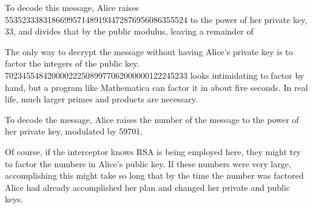 \documentclass[12pt]{article}
\begin{document}
To decode this message, Alice raises 5535233383186699571489193472876956086355524 to the power of her private key, 33, and divides that by the public modulus, leaving a remainder of

The only way to decrypt the message without having Alice's private key is to factor the integers of the public key. 7023455484200002225089977062000000122245233 looks intimidating to factor by hand, but a program like Mathematica can factor it in about five seconds. In real life, much larger primes and products are necessary.

To decode the message, Alice raises the number of the message to the power of her private key, modulated by 59701.

Of course, if the interceptor knows RSA is being employed here, they might try to factor the numbers in Alice's public key. If these numbers were very large, accomplishing this might take so long that by the time the number was factored Alice had already accomplished her plan and changed her private and public keys.
\end{document}
